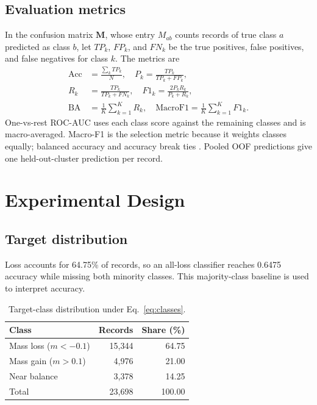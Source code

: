 \documentclass[conference]{IEEEtran}
\begin{document}
\subsection{Evaluation metrics}
In the confusion matrix $\mathbf{M}$, whose entry $M_{ab}$ counts records of true class $a$ predicted as class $b$, let $TP_k$, $FP_k$, and $FN_k$ be the true positives, false positives, and false negatives for class $k$. The metrics are
\begin{align}
\mathrm{Acc}&=\frac{\sum_k TP_k}{N},\quad
P_k=\frac{TP_k}{TP_k+FP_k},\label{eq:prf}\\
R_k&=\frac{TP_k}{TP_k+FN_k},\quad
F1_k=\frac{2P_kR_k}{P_k+R_k},\label{eq:f1}\\
\mathrm{BA}&=\frac{1}{K}\sum_{k=1}^{K}R_k,\quad
\mathrm{MacroF1}=\frac{1}{K}\sum_{k=1}^{K}F1_k.\label{eq:macro}
\end{align}
One-vs-rest ROC-AUC uses each class score against the remaining classes and is macro-averaged. Macro-F1 is the selection metric because it weights classes equally; balanced accuracy and accuracy break ties \cite{sokolova2009}. Pooled OOF predictions give one held-out-cluster prediction per record.

\section{Experimental Design}\label{sec:design}
\subsection{Target distribution}
Loss accounts for 64.75\% of records, so an all-loss classifier reaches 0.6475 accuracy while missing both minority classes. This majority-class baseline is used to interpret accuracy.

\begin{table}[t]
\caption{Target-class distribution under Eq.~\eqref{eq:classes}.}
\label{tab:classes}
\centering
\footnotesize
\begin{tabular}{lrr}
\toprule
Class & Records & Share (\%)\\
\midrule
Mass loss ($m<-0.1$) & 15,344 & 64.75\\
Mass gain ($m>0.1$) & 4,976 & 21.00\\
Near balance & 3,378 & 14.25\\
\midrule
Total & 23,698 & 100.00\\
\bottomrule
\end{tabular}
\end{table}
\end{document}
